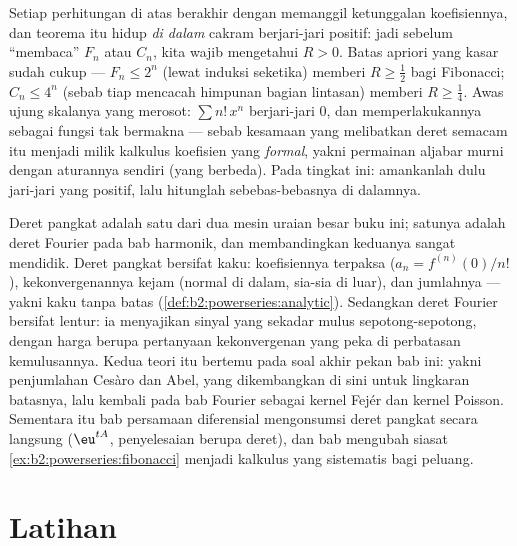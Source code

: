 \begin{remark}
Setiap perhitungan  di atas berakhir dengan memanggil
ketunggalan koefisiennya, dan teorema itu hidup
\emph{di dalam} cakram berjari-jari positif: jadi sebelum ``membaca''
$F_n$ atau $C_n$, kita wajib mengetahui $R > 0$. Batas apriori yang
kasar sudah cukup --- $F_n \leq 2^n$ (lewat induksi seketika) memberi $R
\geq \frac12$ bagi Fibonacci; $C_n \leq 4^n$ (sebab tiap  mencacah himpunan bagian lintasan) memberi $R \geq \frac14$.
Awas ujung skalanya yang merosot: $\sum n!\,x^n$ berjari-jari $0$, dan
memperlakukannya sebagai fungsi tak bermakna --- sebab kesamaan
yang melibatkan deret semacam itu menjadi milik kalkulus koefisien yang
\emph{formal}, yakni permainan aljabar murni dengan aturannya sendiri
(yang berbeda). Pada tingkat ini: amankanlah dulu jari-jari yang positif,
lalu hitunglah sebebas-bebasnya di dalamnya.
\end{remark}

\begin{remark}
Deret pangkat adalah satu dari dua mesin uraian besar buku ini;
satunya adalah deret Fourier pada bab harmonik,
dan membandingkan keduanya sangat mendidik. Deret pangkat bersifat
kaku: koefisiennya terpaksa ($a_n = f^{(n)}(0)/n!$),
kekonvergenannya kejam (normal di dalam, sia-sia di luar),
dan jumlahnya  --- yakni kaku tanpa batas
(\cref{def:b2:powerseries:analytic}). Sedangkan deret Fourier bersifat
lentur: ia menyajikan sinyal yang sekadar mulus sepotong-sepotong, dengan
harga berupa pertanyaan kekonvergenan yang peka di perbatasan
kemulusannya. Kedua teori itu bertemu pada soal akhir pekan bab ini:
yakni penjumlahan Cesàro dan Abel, yang dikembangkan di sini untuk
lingkaran batasnya, lalu kembali pada bab Fourier sebagai kernel Fejér
dan kernel Poisson. Sementara itu bab persamaan diferensial
mengonsumsi deret pangkat secara langsung ($\eu^{tA}$, penyelesaian
berupa deret), dan bab  mengubah
siasat \cref{ex:b2:powerseries:fibonacci} menjadi kalkulus
yang sistematis bagi peluang.
\end{remark}

\section{Latihan}

